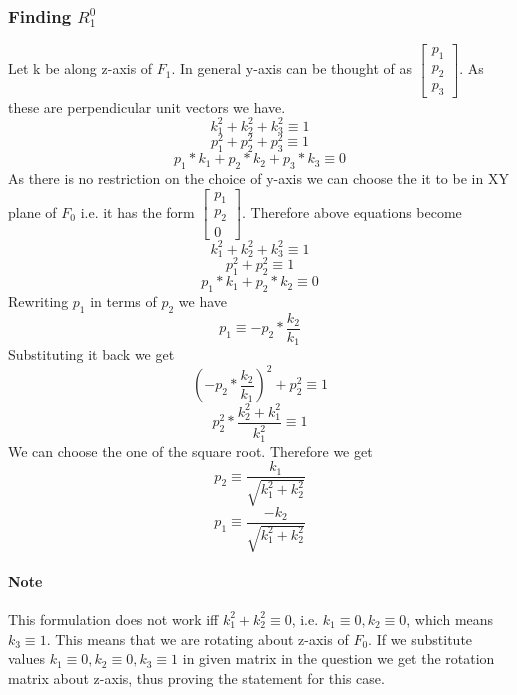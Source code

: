 \documentclass[12pt]{article}
\begin{document}
\subsubsection*{Finding $R_1^0$}
Let k be along z-axis of $ F_1 $. In general y-axis can be thought of as $ \begin{bmatrix} p_1 \\ p_2 \\ p_3 \end{bmatrix} $.
As these are perpendicular unit vectors we have.
\[
  k_1^2 + k_2^2 + k_3^2 \equiv 1
\]
\[
  p_1^2 + p_2^2 + p_3^2 \equiv 1
\]
\[
  p_1 * k_1 + p_2 * k_2 + p_3 * k_3 \equiv 0
\]
As there is no restriction on the choice of y-axis we can choose the it to be in XY plane of $ F_0 $ i.e. it has the form $ \begin{bmatrix} p_1 \\ p_2 \\ 0 \end{bmatrix} $.
Therefore above equations become
\[
  k_1^2 + k_2^2 + k_3^2 \equiv 1
\]
\[
  p_1^2 + p_2^2 \equiv 1
\]
\[
  p_1 * k_1 + p_2 * k_2 \equiv 0
\]
Rewriting $ p_1 $ in terms of $ p_2 $ we have
\[
  p_1 \equiv -p_2 * \frac{k_2}{k_1}
\]
Substituting it back we get
\[
  (-p_2 * \frac{k_2}{k_1})^2 + p_2^2 \equiv 1
\]
\[
  p_2^2 * \frac{k_2^2 + k_1^2}{k_1^2} \equiv 1
\]
We can choose the one of the square root. Therefore we get
\[
  p_2 \equiv \frac{k_1}{\sqrt{k_1^2 + k_2^2}}
\]
\[
  p_1 \equiv \frac{-k_2}{\sqrt{k_1^2 + k_2^2}}
\]

\paragraph{Note} This formulation does not work iff $ k_1^2 + k_2^2 \equiv 0 $, i.e. $ k_1 \equiv 0, k_2 \equiv 0 $, which means $ k_3 \equiv 1 $.
This means that we are rotating about z-axis of $ F_0 $. If we substitute values $ k_1 \equiv 0, k_2 \equiv 0, k_3 \equiv 1 $ in given matrix in the question we get the rotation matrix about z-axis, thus proving the statement for this case.

\section{}
\section{}
\section{}
\section{}
\end{document}
